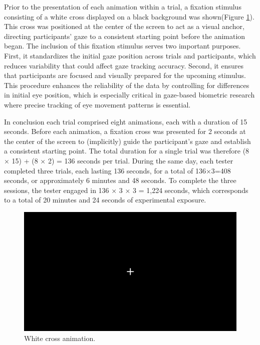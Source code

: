 \documentclass[12pt]{report}
\begin{document}
Prior to the presentation of each animation within a trial, a fixation stimulus consisting of a white cross displayed on a black background was shown(Figure \ref{fig:cross}).
This cross was positioned at the center of the screen to act as a visual anchor, directing participants' gaze to a consistent starting point before the animation began. 
The inclusion of this fixation stimulus serves two important purposes. 
First, it standardizes the initial gaze position across trials and participants, which reduces variability that could affect gaze tracking accuracy. 
Second, it ensures that participants are focused and visually prepared for the upcoming stimulus.
This procedure enhances the reliability of the data by controlling for differences in initial eye position, which is especially critical in gaze-based biometric research where precise tracking of eye movement patterns is essential.

In conclusion each trial comprised eight animations, each with a duration of 15 seconds. 
Before each animation, a fixation cross was presented for 2 seconds at the center of the screen to (implicitly) guide the participant's gaze and establish a consistent starting point. 
The total duration for a single trial was therefore (8 × 15) + (8 × 2) = 136 seconds per trial.
During the same day, each tester completed three trials, each lasting 136 seconds, for a total of 136×3=408 seconds, or approximately 6 minutes and 48 seconds. 
To complete the three sessions, the tester engaged in 136 × 3 × 3 = 1,224 seconds, which corresponds to a total of 20 minutes and 24 seconds of experimental exposure.

\begin{figure}[ht]
    \centering
    \includegraphics[width = 0.6
    \textwidth]{Images/Experiment/cross.png}
    \caption{White cross animation.}
    \label{fig:cross}
\end{figure}
\end{document}
